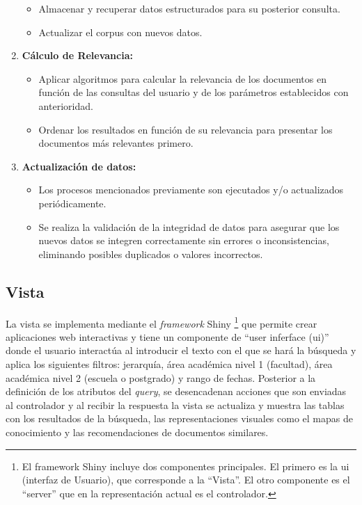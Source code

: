 \documentclass[
  12pt,
  openany]{book}
\begin{document}
\begin{enumerate}
  \begin{itemize}
  \item
    Almacenar y recuperar datos estructurados para su posterior consulta.
  \item
    Actualizar el corpus con nuevos datos.
  \end{itemize}
\item
  \textbf{Cálculo de Relevancia:}

  \begin{itemize}
  \item
    Aplicar algoritmos para calcular la relevancia de los documentos en función de las consultas del usuario y de los parámetros establecidos con anterioridad.
  \item
    Ordenar los resultados en función de su relevancia para presentar los documentos más relevantes primero.
  \end{itemize}
\item
  \textbf{Actualización de datos:}

  \begin{itemize}
  \item
    Los procesos mencionados previamente son ejecutados y/o actualizados periódicamente.
  \item
    Se realiza la validación de la integridad de datos para asegurar que los nuevos datos se integren correctamente sin errores o inconsistencias, eliminando posibles duplicados o valores incorrectos.
  \end{itemize}
\end{enumerate}

\hypertarget{vista}{%
\subsection{\texorpdfstring{\textbf{Vista}}{Vista}}\label{vista}}

La vista se implementa mediante el \emph{framework} Shiny \citep{shiny} \footnote{El framework Shiny incluye dos componentes principales. El primero es la ui (interfaz de Usuario), que corresponde a la ``Vista''. El otro componente es el ``server'' que en la representación actual es el controlador.} que permite crear aplicaciones web interactivas y tiene un componente de ``user inferface (ui)'' donde el usuario interactúa al introducir el texto con el que se hará la búsqueda y aplica los siguientes filtros: jerarquía, área académica nivel 1 (facultad), área académica nivel 2 (escuela o postgrado) y rango de fechas. Posterior a la definición de los atributos del \emph{query}, se desencadenan acciones que son enviadas al controlador y al recibir la respuesta la vista se actualiza y muestra las tablas con los resultados de la búsqueda, las representaciones visuales como el mapas de conocimiento y las recomendaciones de documentos similares.
\end{document}

